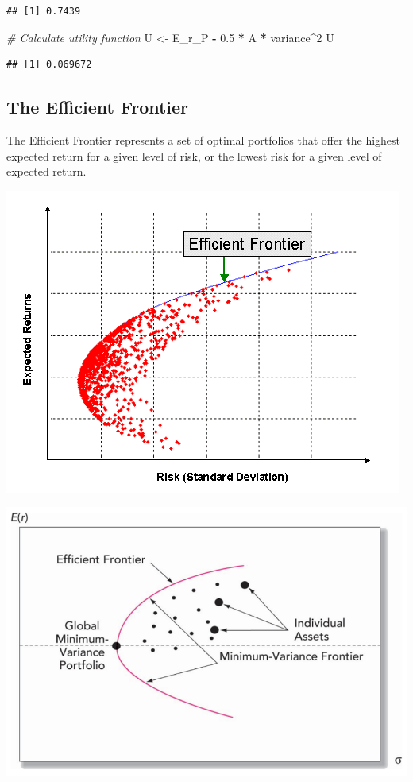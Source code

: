 \documentclass[
]{book}
\newenvironment{Shaded}{\begin{snugshade}}{\end{snugshade}}
\newcommand{\CommentTok}[1]{\textcolor[rgb]{0.56,0.35,0.01}{\textit{#1}}}
\newcommand{\DecValTok}[1]{\textcolor[rgb]{0.00,0.00,0.81}{#1}}
\newcommand{\FloatTok}[1]{\textcolor[rgb]{0.00,0.00,0.81}{#1}}
\newcommand{\NormalTok}[1]{#1}
\newcommand{\OtherTok}[1]{\textcolor[rgb]{0.56,0.35,0.01}{#1}}
\newcommand{\SpecialCharTok}[1]{\textcolor[rgb]{0.81,0.36,0.00}{\textbf{#1}}}
\begin{document}
\begin{verbatim}
## [1] 0.7439
\end{verbatim}

\begin{Shaded}
\begin{Highlighting}[]
\CommentTok{\# Calculate utility function}
\NormalTok{U }\OtherTok{\textless{}{-}}\NormalTok{ E\_r\_P }\SpecialCharTok{{-}} \FloatTok{0.5} \SpecialCharTok{*}\NormalTok{ A }\SpecialCharTok{*}\NormalTok{ variance}\SpecialCharTok{\^{}}\DecValTok{2}
\NormalTok{U}
\end{Highlighting}
\end{Shaded}

\begin{verbatim}
## [1] 0.069672
\end{verbatim}

\hypertarget{the-efficient-frontier}{%
\subsection{The Efficient Frontier}\label{the-efficient-frontier}}

The Efficient Frontier represents a set of optimal portfolios that offer
the highest expected return for a given level of risk, or the lowest
risk for a given level of expected return.

\includegraphics{Resources/efffrontier2.png}

\includegraphics{Resources/efffrontier.png}
\end{document}
